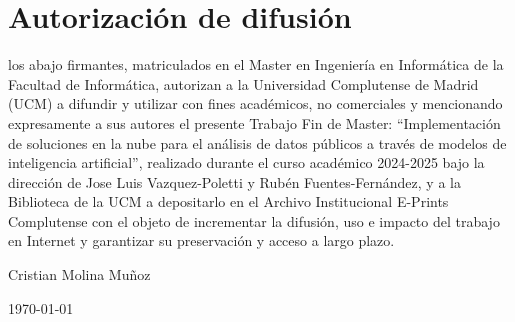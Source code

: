 \chapter*{Autorización de difusión}

   
los abajo firmantes, matriculados en el Master en Ingeniería en Informática de la Facultad de Informática, autorizan a la Universidad Complutense de Madrid (UCM) a difundir y utilizar con fines académicos, no comerciales y mencionando expresamente a sus autores el presente Trabajo Fin de Master: ``Implementación de soluciones en la nube para el análisis de datos públicos a través de modelos de inteligencia artificial'', realizado durante el curso académico 2024-2025 bajo la dirección de Jose Luis Vazquez-Poletti y Rubén Fuentes-Fernández, y a la Biblioteca de la UCM a depositarlo en el Archivo Institucional E-Prints Complutense con el objeto de incrementar la difusión, uso e impacto del trabajo en Internet y garantizar su preservación y acceso a largo plazo.

\vspace{5cm}

\begin{center}
	\large Cristian Molina Muñoz\\
	
	\vspace{0.5cm}
	
	
	\today\\
	
\end{center}
